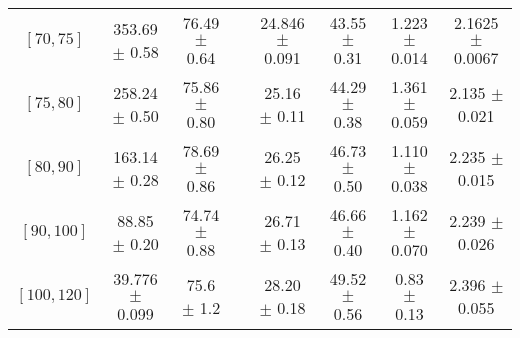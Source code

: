 \begin{tabular}{c||c|c|c|c|c|c|c}
$[70, 75]$ & 353.69 $\pm$ 0.58 & 76.49 $\pm$ 0.64 &  & 24.846 $\pm$ 0.091 & 43.55 $\pm$ 0.31 & 1.223 $\pm$ 0.014 & 2.1625 $\pm$ 0.0067\\
$[75, 80]$ & 258.24 $\pm$ 0.50 & 75.86 $\pm$ 0.80 &  & 25.16 $\pm$ 0.11 & 44.29 $\pm$ 0.38 & 1.361 $\pm$ 0.059 & 2.135 $\pm$ 0.021\\
$[80, 90]$ & 163.14 $\pm$ 0.28 & 78.69 $\pm$ 0.86 &  & 26.25 $\pm$ 0.12 & 46.73 $\pm$ 0.50 & 1.110 $\pm$ 0.038 & 2.235 $\pm$ 0.015\\
$[90, 100]$ & 88.85 $\pm$ 0.20 & 74.74 $\pm$ 0.88 &  & 26.71 $\pm$ 0.13 & 46.66 $\pm$ 0.40 & 1.162 $\pm$ 0.070 & 2.239 $\pm$ 0.026\\
$[100, 120]$ & 39.776 $\pm$ 0.099 & 75.6 $\pm$ 1.2 &  & 28.20 $\pm$ 0.18 & 49.52 $\pm$ 0.56 & 0.83 $\pm$ 0.13 & 2.396 $\pm$ 0.055\\
\end{tabular}
